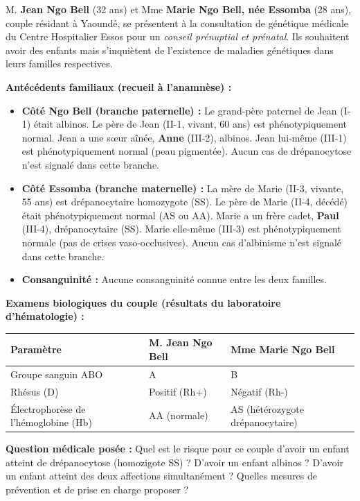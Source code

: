 \documentclass[11pt]{article}
\begin{document}
\begin{experience}
M. \textbf{Jean Ngo Bell} (32 ans) et Mme \textbf{Marie Ngo Bell, née Essomba} (28 ans), couple résidant à Yaoundé, se présentent à la consultation de génétique médicale du Centre Hospitalier Essos pour un \emph{conseil prénuptial et prénatal}. Ils souhaitent avoir des enfants mais s'inquiètent de l'existence de maladies génétiques dans leurs familles respectives.

\textbf{Antécédents familiaux (recueil à l'anamnèse) :}
\begin{itemize}
    \item \textbf{Côté Ngo Bell (branche paternelle) :} Le grand-père paternel de Jean (I-1) était albinos. Le père de Jean (II-1, vivant, 60 ans) est phénotypiquement normal. Jean a une sœur aînée, \textbf{Anne} (III-2), albinos. Jean lui-même (III-1) est phénotypiquement normal (peau pigmentée). Aucun cas de drépanocytose n'est signalé dans cette branche.
    \item \textbf{Côté Essomba (branche maternelle) :} La mère de Marie (II-3, vivante, 55 ans) est drépanocytaire homozygote (SS). Le père de Marie (II-4, décédé) était phénotypiquement normal (AS ou AA). Marie a un frère cadet, \textbf{Paul} (III-4), drépanocytaire (SS). Marie elle-même (III-3) est phénotypiquement normale (pas de crises vaso-occlusives). Aucun cas d'albinisme n'est signalé dans cette branche.
    \item \textbf{Consanguinité :} Aucune consanguinité connue entre les deux familles.
\end{itemize}

\textbf{Examens biologiques du couple (résultats du laboratoire d'hématologie) :}
\begin{center}
\begin{tabularx}{\linewidth}{|l|X|X|}\hline
\rowcolor{popblueL} \textbf{Paramètre} & \textbf{M. Jean Ngo Bell} & \textbf{Mme Marie Ngo Bell} \\ \hline
Groupe sanguin ABO & A & B \\
Rhésus (D) & Positif (Rh+) & Négatif (Rh-) \\
Électrophorèse de l'hémoglobine (Hb) & AA (normale) & AS (hétérozygote drépanocytaire) \\ \hline
\end{tabularx}
\end{center}

\textbf{Question médicale posée :} Quel est le risque pour ce couple d'avoir un enfant atteint de drépanocytose (homozigote SS) ? D'avoir un enfant albinos ? D'avoir un enfant atteint des deux affections simultanément ? Quelles mesures de prévention et de prise en charge proposer ?
\end{experience}
\end{document}
